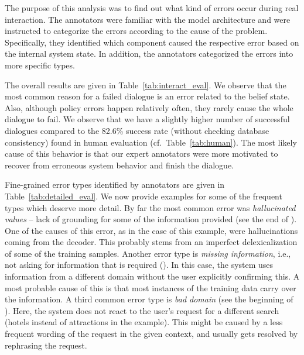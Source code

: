 \documentclass[11pt,a4paper]{article}
\begin{document}
The purpose of this analysis was to find out what kind of errors occur during real interaction.
The annotators were familiar with the model architecture and were instructed to categorize the errors according to the cause of the problem.
Specifically, they identified which component caused the respective error based on the internal system state.
In addition, the annotators categorized the errors into more specific types. 

The overall results are given in Table~\ref{tab:interact_eval}.
We observe that the most common reason for a failed dialogue is an error related to the belief state.
Also, although policy errors happen relatively often, they rarely cause the whole dialogue to fail.
We observe that we have a slightly higher number of successful dialogues compared to the 82.6\% success rate (without checking database consistency) found in human evaluation (cf.\ Table~\ref{tab:human}).
The most likely cause of this behavior is that our expert annotators were more motivated to recover from erroneous system behavior and finish the dialogue.


Fine-grained error types identified by annotators are given in Table~\ref{tab:detailed_eval}. We now provide examples for some of the frequent types which deserve more detail.
By far the most common error was \emph{hallucinated values} -- lack of grounding for some of the information provided (see the end of ). One of the causes of this error, as in the case of this example, were hallucinations coming from the decoder. This probably stems from an imperfect delexicalization of some of the training samples.
Another error type is \emph{missing information}, i.e., not asking for information that is required (). In this case, the system uses information from a different domain without the user explicitly confirming this.
A most probable cause of this is that most instances of the training data carry over the information.
A third common error type is \emph{bad domain} (see the beginning of ). Here, the system does not react to the user's request for a different search (hotels instead of attractions in the example). This might be caused by a less frequent wording of the request in the given context, and usually gets resolved by rephrasing the request.
\end{document}
